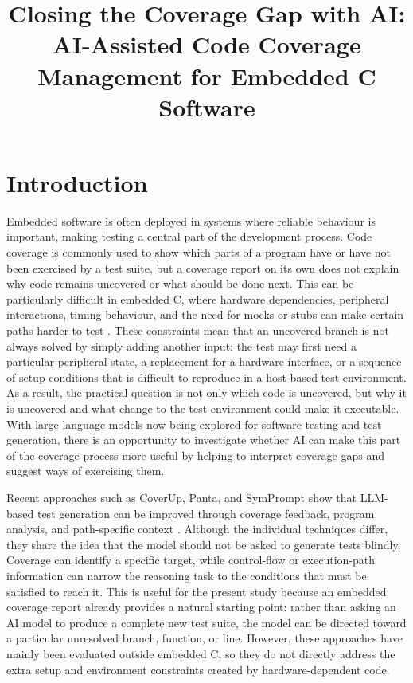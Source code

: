\documentclass[conference]{IEEEtran}
\title{Closing the Coverage Gap with AI: AI-Assisted Code Coverage Management for Embedded C Software}
\author{
\IEEEauthorblockN{Dara Heaphy}
\IEEEauthorblockA{
University of Limerick\\
Limerick, Ireland
}
}
\begin{document}
\maketitle

\section{Introduction}


Embedded software is often deployed in systems where reliable behaviour is
important, making testing a central part of the development process. Code
coverage is commonly used to show which parts of a program have or have not
been exercised by a test suite, but a coverage report on its own does not
explain why code remains uncovered or what should be done next. This can be
particularly difficult in embedded C, where hardware dependencies, peripheral
interactions, timing behaviour, and the need for mocks or stubs can make
certain paths harder to test \cite{garousi2018}. These constraints mean that an
uncovered branch is not always solved by simply adding another input: the test
may first need a particular peripheral state, a replacement for a hardware
interface, or a sequence of setup conditions that is difficult to reproduce in
a host-based test environment. As a result, the practical question is not only
which code is uncovered, but why it is uncovered and what change to the test
environment could make it executable. With large language models now
being explored for software testing and test generation, there is an
opportunity to investigate whether AI can make this part of the coverage
process more useful by helping to interpret coverage gaps and suggest ways of
exercising them.


Recent approaches such as CoverUp, Panta, and SymPrompt show that LLM-based
test generation can be improved through coverage feedback, program analysis,
and path-specific context \cite{pizzorno2025,gu2026,ryan2024}. Although the
individual techniques differ, they share the idea that the model should not be
asked to generate tests blindly. Coverage can identify a specific target,
while control-flow or execution-path information can narrow the reasoning task
to the conditions that must be satisfied to reach it. This is useful for the
present study because an embedded coverage report already provides a natural
starting point: rather than asking an AI model to produce a complete new test
suite, the model can be directed toward a particular unresolved branch,
function, or line. However, these approaches have mainly been evaluated outside
embedded C, so they do not directly address the extra setup and environment
constraints created by hardware-dependent code.
\end{document}
